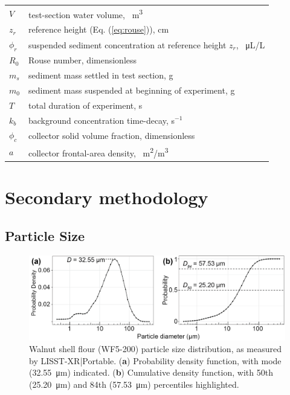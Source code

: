 \documentclass[geosciences,article,submit,moreauthors,pdftex]{Definitions/mdpi}
\begin{document}
{\begin{tabular}{@{}ll}
 $V$ & test-section water volume, \SI{}{\metre\cubed} \\
 $z_r$ & reference height (Eq. (\ref{eq:rouse})), cm \\
 $\phi_r$ & suspended sediment concentration at reference height $z_r$, \SI{}{\micro\liter/\liter} \\
 $R_0$ & Rouse number, dimensionless \\
 $m_s$ & sediment mass settled in test section, g \\
 $m_0$ & sediment mass suspended at beginning of experiment, g \\
 $T$ & total duration of experiment, s \\
 $k_b$ & background concentration time-decay, s$^{-1}$ \\
 $\phi_c$ & collector solid volume fraction, dimensionless \\
 $a$ & collector frontal-area density, \SI{}{\metre\squared/\metre\cubed}
 \end{tabular}}
\appendix
\section{Secondary methodology}
\unskip
\subsection{Particle Size}
\begin{figure}[H]
\centering
\includegraphics[width=5in]{../pics/wf5-200sizedist.png}
\caption{Walnut shell flour (WF5-200) particle size distribution, as measured by LISST-XR|Portable. (\textbf{a}) Probability density function, with mode (\SI{32.55}{\micro\metre}) indicated. (\textbf{b}) Cumulative density function, with 50th (\SI{25.20}{\micro\metre}) and 84th (\SI{57.53}{\micro\metre}) percentiles highlighted.}
\end{figure}
\end{document}
